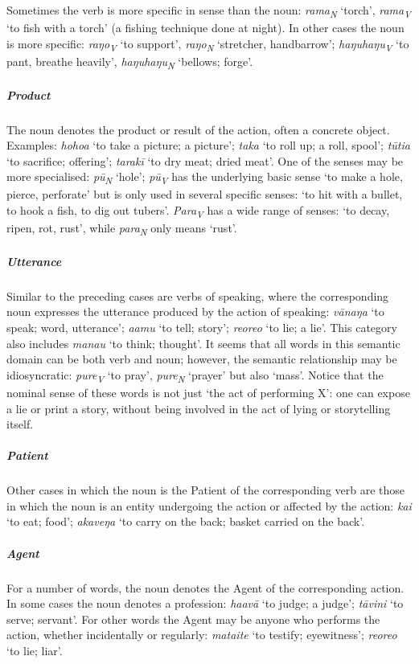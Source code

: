 Sometimes the verb is more specific in sense than the noun: \textit{rama}\textit{\textsubscript{N}} ‘torch’, \textit{rama}\textit{\textsubscript{V}} ‘to fish with a torch’ (a fishing technique done at night). In other cases the noun is more specific: \textit{raŋo}\textit{\textsubscript{V}} ‘to support’, \textit{raŋo}\textit{\textsubscript{N}} ‘stretcher, handbarrow’; \textit{haŋuhaŋu}\textit{\textsubscript{V}} ‘to pant, breathe heavily’, \textit{haŋuhaŋu}\textit{\textsubscript{N}} ‘bellows; forge’. 

\subparagraph{Product} The noun denotes the product or result of the action, often a concrete object. Examples: \textit{hoho{\ꞌ}a}\textit{\textsubscript{}} ‘to take a picture; a picture’; \textit{taka} ‘to roll up; a roll, spool’; \textit{tūtia} ‘to sacrifice; offering’; \textit{tarakī} ‘to dry meat; dried meat’. One of the senses may be more specialised: \textit{pū}\textit{\textsubscript{N}} ‘hole’; \textit{pū}\textit{\textsubscript{V}} has the underlying basic sense ‘to make a hole, pierce, perforate’ but is only used in several specific senses: ‘to hit with a bullet, to hook a fish, to dig out tubers’. \textit{Para}\textit{\textsubscript{V}} has a wide range of senses: ‘to decay, ripen, rot, rust’, while \textit{para}\textit{\textsubscript{N}} only means ‘rust’.

\subparagraph{Utterance} Similar to the preceding cases are verbs of speaking, where the corresponding noun expresses the utterance produced by the action of speaking: \textit{vānaŋa} ‘to speak; word, utterance’; \textit{\mbox{{\ꞌ}a{\ꞌ}amu}} ‘to tell; story’; \textit{reoreo} ‘to lie; a lie’. This category also includes \textit{mana{\ꞌ}u} ‘to think; thought’. It seems that all words in this semantic domain can be both verb and noun; however, the semantic relationship may be idiosyncratic: \textit{pure}\textit{\textsubscript{V}} ‘to pray’, \textit{pure}\textit{\textsubscript{N}} ‘prayer’ but also ‘mass’. Notice that the nominal sense of these words is not just ‘the act of performing X’: one can expose a lie or print a story, without being involved in the act of lying or storytelling itself. 

\subparagraph{Patient} Other cases in which the noun is the Patient of the corresponding verb are those in which the noun is an entity undergoing the action or affected by the action: \textit{kai} ‘to eat; food’; \textit{{\ꞌ}akaveŋa} ‘to carry on the back; basket carried on the back’.

\subparagraph{Agent} For a number of words, the noun denotes the Agent of the corresponding action. In some cases the noun denotes a profession: \textit{ha{\ꞌ}avā} ‘to judge; a judge’; \textit{tāvini} ‘to serve; servant’. For other words the Agent may be anyone who performs the action, whether incidentally or regularly: \textit{mata{\ꞌ}ite} ‘to testify; eyewitness’; \textit{reoreo} ‘to lie; liar’. 

